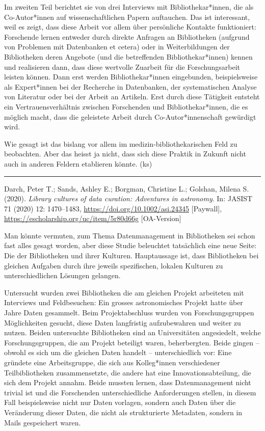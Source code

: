 \documentclass[a4paper,
fontsize=11pt,
oneside,
numbers=noperiodatend,
parskip=half-,
bibliography=totoc,
final
]{scrartcl}
\begin{document}
Im zweiten Teil berichtet sie von drei Interviews mit
Bibliothekar*innen, die als Co-Autor*innen auf wissenschaftlichen Papern
auftauchen. Das ist interessant, weil es zeigt, dass diese Arbeit vor
allem über persönliche Kontakte funktioniert: Forschende lernen entweder
durch direkte Anfragen an Bibliotheken (aufgrund von Problemen mit
Datenbanken et cetera) oder in Weiterbildungen der Bibliotheken deren
Angebote (und die betreffenden Bibliothekar*innen) kennen und
realisieren dann, dass diese wertvolle Zuarbeit für die Forschungsarbeit
leisten können. Dann erst werden Bibliothekar*innen eingebunden,
beispielsweise als Expert*innen bei der Recherche in Datenbanken, der
systematischen Analyse von Literatur oder bei der Arbeit an Artikeln.
Erst durch diese Tätigkeit entsteht ein Vertrauensverhältnis zwischen
Forschenden und Bibliothekar*innen, die es möglich macht, dass die
geleistete Arbeit durch Co-Autor*innenschaft gewürdigt wird.

Wie gesagt ist das bislang vor allem im medizin-bibliothekarischen Feld
zu beobachten. Aber das heisst ja nicht, dass sich diese Praktik in
Zukunft nicht auch in anderen Feldern etablieren könnte. (ks)

\begin{center}\rule{0.5\linewidth}{0.5pt}\end{center}

Darch, Peter T.; Sands, Ashley E.; Borgman, Christine L.; Golshan,
Milena S. (2020). \emph{Library cultures of data curation: Adventures in
astronomy}. In: JASIST 71 (2020) 12: 1470--1483,
\url{https://doi.org/10.1002/asi.24345} {[}Paywall{]},
\url{https://escholarship.org/uc/item/5r80d66g} {[}OA-Version{]}

Man könnte vermuten, zum Thema Datenmanagement in Bibliotheken sei schon
fast alles gesagt worden, aber diese Studie beleuchtet tatsächlich eine
neue Seite: Die der Bibliotheken und ihrer Kulturen. Hauptaussage ist,
dass Bibliotheken bei gleichen Aufgaben durch ihre jeweils spezifischen,
lokalen Kulturen zu unterschiedlichen Lösungen gelangen.

Untersucht wurden zwei Bibliotheken die am gleichen Projekt arbeiteten
mit Interviews und Feldbesuchen: Ein grosses astronomisches Projekt
hatte über Jahre Daten gesammelt. Beim Projektabschluss wurden von
Forschungsgruppen Möglichkeiten gesucht, diese Daten langfristig
aufzubewahren und weiter zu nutzen. Beiden untersuchte Bibliotheken sind
an Universitäten angesiedelt, welche Forschungsgruppen, die am Projekt
beteiligt waren, beherbergten. Beide gingen -- obwohl es sich um die
gleichen Daten handelt -- unterschiedlich vor: Eine gründete eine
Arbeitsgruppe, die sich aus Kolleg*innen verschiedener Teilbibliotheken
zusammensetzte, die andere hat eine Innovationsabteilung, die sich dem
Projekt annahm. Beide mussten lernen, dass Datenmanagement nicht trivial
ist und die Forschenden unterschiedliche Anforderungen stellen, in
diesem Fall beispielsweise nicht nur Daten vorlagen, sondern auch Daten
über die Veränderung dieser Daten, die nicht als strukturierte
Metadaten, sondern in Mails gespeichert waren.
\end{document}
